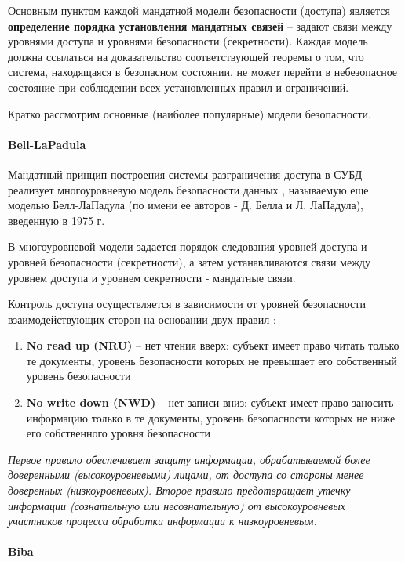 Основным пунктом каждой мандатной модели безопасности (доступа) является \textbf{определение порядка установления 
мандатных связей} -- задают связи между уровнями доступа и уровнями безопасности (секретности). Каждая модель 
должна ссылаться на доказательство соответствующей теоремы о том, что система, находящаяся в безопасном 
состоянии, не может перейти в небезопасное состояние при соблюдении всех установленных правил и ограничений.

Кратко рассмотрим основные (наиболее популярные) модели безопасности.

\paragraph{Bell-LaPadula}

Мандатный принцип построения системы разграничения доступа в СУБД реализует многоуровневую модель безопасности 
данных \autocite{Skakun}, называемую еще моделью Белл-ЛаПадула (по имени ее авторов - Д. Белла и Л. ЛаПадула), 
введенную в 1975 г.

В многоуровневой модели задается порядок следования уровней доступа и уровней безопасности (секретности), 
а затем устанавливаются связи между уровнем доступа и уровнем секретности - мандатные связи.

Контроль доступа осуществляется в зависимости от уровней безопасности взаимодействующих сторон на 
основании двух правил \autocite{URFULecture10Models}:
\begin{enumerate}
    \item \textbf{No read up (NRU)} – нет чтения вверх: субъект имеет право читать только те документы, 
    уровень безопасности которых не превышает его собственный уровень безопасности

    \item \textbf{No write down (NWD)} – нет записи вниз: субъект имеет право заносить информацию только 
    в те документы, уровень безопасности которых не ниже его собственного уровня безопасности
\end{enumerate}

\textit{Первое правило обеспечивает защиту информации, обрабатываемой более доверенными 
(высокоуровневыми) лицами, от доступа со стороны менее доверенных (низкоуровневых). Второе правило 
предотвращает утечку информации (сознательную или несознательную) от высокоуровневых участников 
процесса обработки информации к низкоуровневым.}

\paragraph{Biba}
